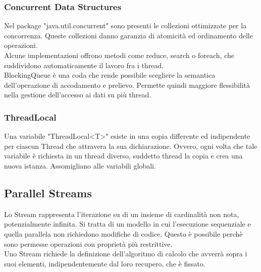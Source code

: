 \documentclass{article}
\begin{document}
\subsubsection{Concurrent Data Structures}

Nel package "java.util.concurrent" sono presenti le collezioni ottimizzate per
la concorrenza. Queste collezioni danno garanzia di atomicità ed ordinamento
delle operazioni.\\
Alcune implementazioni offrono metodi come reduce, search o foreach, che
suddividono automaticamente il lavoro fra i thread.\\

BlockingQueue è una coda che rende possibile scegliere la semantica
dell'operazione di accodamento e prelievo. Permette quindi maggiore
flessibilità nella gestione dell'accesso ai dati su più thread.

\subsubsection{ThreadLocal}

Una variabile "ThreadLocal<T>" esiste in una copia differente ed indipendente
per ciascun Thread che attravera la sua dichiarazione. Ovvero, ogni volta che
tale variabile è richiesta in un thread diverso, suddetto thread la copia e 
crea una nuova istanza. Assomigliano alle variabili globali.

\subsection{Parallel Streams}
Lo Stream rappresenta l'iterazione su di un insieme di cardinalità non nota,
potenzialmente infinita. Si tratta di un modello in cui l'esecuzione sequenziale
e quella parallela non richiedono modifiche di codice. Questo è possibile perchè
sono permesse operazioni con proprietà più restrittive.\\
Uno Stream richiede la definizione dell'algoritmo di calcolo che avverrà sopra i
suoi elementi, indipendentemente dal loro recupero, che è fissato.
\end{document}
